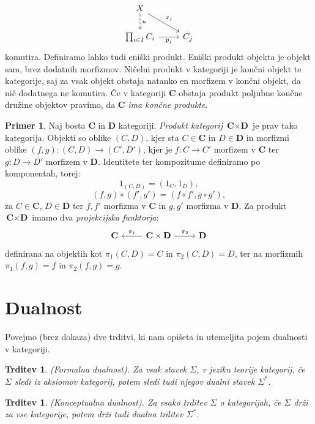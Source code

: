\documentclass[12pt,a4paper]{book}
\theoremstyle{definition}
\theoremstyle{plain}
\newtheorem{trditev}[definicija]{Trditev}
\theoremstyle{definition}
\newtheorem{primer}{Primer}[section]
\theoremstyle{remark}
\newcommand{\cat}[1]{\textbf{#1}}
\begin{document}
$$\begin{tikzcd}
X \ar[d, dashed, "u"] \ar[dr, "x_j"] & \\
\prod_{i \in I}C_i \ar[r, "p_j"'] & C_j
\end{tikzcd}$$
komutira.
%
Definiramo lahko tudi eniški produkt. Eniški produkt objekta je objekt sam, brez dodatnih morfizmov. Ničelni produkt v kategoriji je končni objekt te kategorije, saj za vsak objekt obstaja natanko en morfizem v končni objekt, da nič dodatnega ne komutira. Če v kategoriji $\cat{C}$ obstaja produkt poljubne končne družine objektov pravimo, da $\cat{C}$ \emph{ima končne produkte}.
%
\begin{primer}
Naj bosta $\cat{C}$ in $\cat{D}$ kategoriji. \emph{Produkt kategorij} $\cat{C} \times \cat{D}$ je prav tako kategorija. Objekti so oblike $(C,D)$, kjer sta $C \in \cat{C}$ in $D \in \cat{D}$ in morfizmi oblike $(f,g) : (C,D) \to (C',D')$, kjer je $f : C \to C'$ morfizem v $\cat{C}$ ter $g : D \to D'$ morfizem v $\cat{D}$. Identitete ter kompozitume definiramo po komponentah, torej:
\begin{equation*}
1_{(C,D)} = (1_C,1_D),
\end{equation*}
\begin{equation*}
(f,g) \circ (f',g') = (f \circ f', g \circ g'),
\end{equation*}
za $C \in \cat{C}$, $D \in \cat{D}$ ter $f,f'$ morfizma v $\cat{C}$ in $g,g'$ morfizma v $\cat{D}$.
Za produkt $\cat{C} \times \cat{D}$ imamo dva \textit{projekcijska funktorja}:
\[
\begin{tikzcd}
\cat{C} & \arrow[l, "\pi_1"'] \cat{C} \times \cat{D} \arrow[r, "\pi_2"] & \cat{D}
\end{tikzcd}
\]
definirana na objektih kot $\pi_1(C,D) = C$ in $\pi_2(C,D) = D$, ter na morfizmih $\pi_1(f,g) = f$ in $\pi_2(f,g) = g$.
\end{primer}

\section{Dualnost}
Povejmo (brez dokaza) dve trditvi, ki nam opišeta in utemeljita pojem dualnosti v kategoriji.

\begin{trditev} \emph{(Formalna dualnost)}. 
Za vsak stavek $\Sigma$, v jeziku teorije kategorij, če $\Sigma$ sledi iz aksiomov kategorij, potem sledi tudi njegov dualni stavek $\Sigma^*$.
\end{trditev}

\begin{trditev} \emph{(Konceptualna dualnost)}.
Za vsako trditev $\Sigma$ o kategorijah, če $\Sigma$ drži za vse kategorije, potem drži tudi dualna trditev $\Sigma^*$.
\end{trditev}
\end{document}
